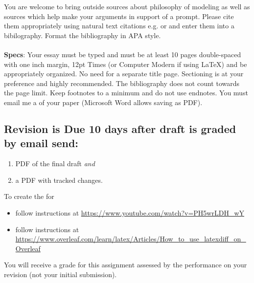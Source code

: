 \documentclass[12pt]{article}
\begin{document}
\noindent You are welcome to bring outside sources about philosophy of modeling as well as sources which help make your arguments in support of a prompt. Please cite them appropriately using natural text citations e.g.  or  and enter them into a bibilography. Format the bibliography in APA style.\\
~\\
\textbf{Specs}: Your essay must be typed and must be at least 10 pages double-spaced with one inch margin, 12pt Times (or Computer Modern if using \LaTeX) and be appropriately organized. No need for a separate title page. Sectioning is at your preference and highly recommended. The bibliography does not count towards the page limit. Keep footnotes to a minimum and do not use endnotes. You must email me a   of your paper (Microsoft Word allows saving as PDF).

\subsection*{Revision is Due 10 days after draft is graded by email send:}


\begin{enumerate}[1.]
\item PDF of the final draft \textit{and} 
\item a PDF with tracked changes. 
\end{enumerate}

\noindent To create the  for

\begin{itemize}
\item[MS Word:] follow instructions at \url{https://www.youtube.com/watch?v=PH5wrLDH_wY}
\item[\LaTeX:] follow instructions at \url{https://www.overleaf.com/learn/latex/Articles/How_to_use_latexdiff_on_Overleaf}
\end{itemize}

\noindent You will receive a grade for this assignment assessed by the performance on your revision (not your initial submission).
\end{document}
